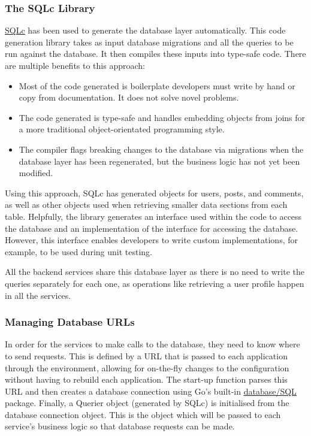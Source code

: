 \subsubsection{The SQLc Library}
\underline{\href{https://sqlc.dev}{SQLc}} \nocite{sqlc} has been used to generate the database layer automatically.
This code generation library takes as input database migrations and all the queries to be run against the database.
It then compiles these inputs into type-safe code. There are multiple benefits to this approach:
\begin{itemize}
    \item Most of the code generated is boilerplate developers must write by hand or copy from documentation. It does not solve novel problems.
    \item The code generated is type-safe and handles embedding objects from joins for a more traditional object-orientated programming style. 
    \item The compiler flags breaking changes to the database via migrations when the database layer has been regenerated, but the business logic has not yet been modified.
\end{itemize}
Using this approach, SQLc has generated objects for users, posts, and comments, as well as other objects used when retrieving smaller data sections from each table.
Helpfully, the library generates an interface used within the code to access the database and an implementation of the interface for accessing the database.
However, this interface enables developers to write custom implementations, for example, to be used during unit testing. 

All the backend services share this database layer as there is no need to write the queries separately for each one, as operations like retrieving a user profile happen in all the services.

\subsubsection{Managing Database URLs}
In order for the services to make calls to the database, they need to know where to send requests.
This is defined by a URL that is passed to each application through the environment, allowing for on-the-fly changes to the configuration without having to rebuild each application. 
The start-up function parses this URL and then creates a database connection using Go's built-in \underline{\href{https://pkg.go.dev/database/sql}{database/SQL}} \nocite{gosqlpkg} package.
Finally, a Querier object (generated by SQLc) is initialised from the database connection object. This is the object which will be passed to each service's business logic so that database requests can be made.

